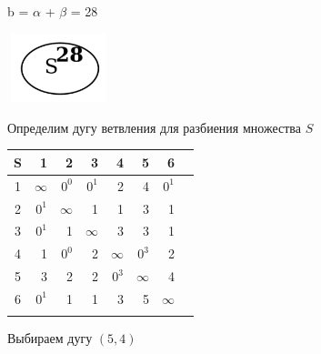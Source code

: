 \documentclass[12pt]{article}
\begin{document}
b = $\alpha$ + $\beta$ = 28

\begin{flushleft}
 
\includegraphics[width=3cm, height=2cm]{pictures/picture_15.jpg}\\
\end{flushleft}
\vspace{4cm}

Определим дугу ветвления для разбиения множества $S$
\vspace{1cm}

\begin{flushleft}
\begin{tabular}{c||rrrrrr||c}
S & 1 & 2 & 3 & 4 & 5 & 6 & \\
\hline
\hline
1 & $\infty$ & $0^0$ & $0^1$ & 2 & 4 & $0^1$ & \\
2 & $0^1$ & $\infty$ & 1 & 1 & 3 & 1 & \\
3 & $0^1$ & 1 & $\infty$ & 3 & 3 & 1 & \\
4 & 1 & $0^0$ & 2 & $\infty$ & $0^3$ & 2 & \\
5 & 3 & 2 & 2 & $0^3$ & $\infty$ & 4 & \\
    6 & $0^1$ & 1 & 1 & 3 & 5 & $\infty$ & \\
\hline
\hline
 &  &  &  &  & & & \\
\end{tabular}
\end{flushleft} 

Выбираем дугу $(5,4)$ 
\end{document}
